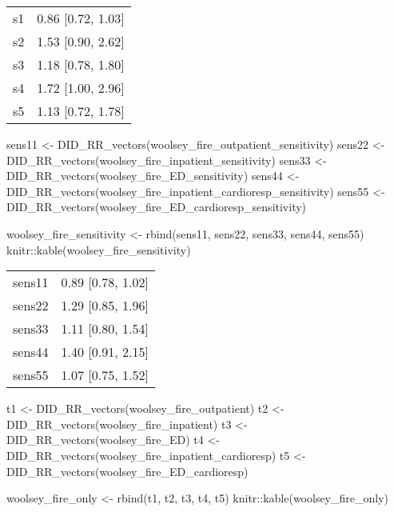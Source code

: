 \documentclass[
]{article}
\newenvironment{Shaded}{\begin{snugshade}}{\end{snugshade}}
\newcommand{\FunctionTok}[1]{\textcolor[rgb]{0.00,0.00,0.00}{#1}}
\newcommand{\NormalTok}[1]{#1}
\newcommand{\OtherTok}[1]{\textcolor[rgb]{0.56,0.35,0.01}{#1}}
\newcommand{\SpecialCharTok}[1]{\textcolor[rgb]{0.00,0.00,0.00}{#1}}
\begin{document}
\begin{longtable}[]{@{}ll@{}}
\toprule()
\endhead
s1 & 0.86 {[}0.72, 1.03{]} \\
s2 & 1.53 {[}0.90, 2.62{]} \\
s3 & 1.18 {[}0.78, 1.80{]} \\
s4 & 1.72 {[}1.00, 2.96{]} \\
s5 & 1.13 {[}0.72, 1.78{]} \\
\bottomrule()
\end{longtable}

\begin{Shaded}
\begin{Highlighting}[]
\NormalTok{sens11 }\OtherTok{\textless{}{-}} \FunctionTok{DID\_RR\_vectors}\NormalTok{(woolsey\_fire\_outpatient\_sensitivity)}
\NormalTok{sens22 }\OtherTok{\textless{}{-}} \FunctionTok{DID\_RR\_vectors}\NormalTok{(woolsey\_fire\_inpatient\_sensitivity)}
\NormalTok{sens33 }\OtherTok{\textless{}{-}} \FunctionTok{DID\_RR\_vectors}\NormalTok{(woolsey\_fire\_ED\_sensitivity)}
\NormalTok{sens44 }\OtherTok{\textless{}{-}} \FunctionTok{DID\_RR\_vectors}\NormalTok{(woolsey\_fire\_inpatient\_cardioresp\_sensitivity)}
\NormalTok{sens55 }\OtherTok{\textless{}{-}} \FunctionTok{DID\_RR\_vectors}\NormalTok{(woolsey\_fire\_ED\_cardioresp\_sensitivity)}

\NormalTok{woolsey\_fire\_sensitivity }\OtherTok{\textless{}{-}} \FunctionTok{rbind}\NormalTok{(sens11, sens22, sens33, sens44, sens55)}
\NormalTok{knitr}\SpecialCharTok{::}\FunctionTok{kable}\NormalTok{(woolsey\_fire\_sensitivity)}
\end{Highlighting}
\end{Shaded}

\begin{longtable}[]{@{}ll@{}}
\toprule()
\endhead
sens11 & 0.89 {[}0.78, 1.02{]} \\
sens22 & 1.29 {[}0.85, 1.96{]} \\
sens33 & 1.11 {[}0.80, 1.54{]} \\
sens44 & 1.40 {[}0.91, 2.15{]} \\
sens55 & 1.07 {[}0.75, 1.52{]} \\
\bottomrule()
\end{longtable}

\begin{Shaded}
\begin{Highlighting}[]
\NormalTok{t1 }\OtherTok{\textless{}{-}} \FunctionTok{DID\_RR\_vectors}\NormalTok{(woolsey\_fire\_outpatient)}
\NormalTok{t2 }\OtherTok{\textless{}{-}} \FunctionTok{DID\_RR\_vectors}\NormalTok{(woolsey\_fire\_inpatient)}
\NormalTok{t3 }\OtherTok{\textless{}{-}} \FunctionTok{DID\_RR\_vectors}\NormalTok{(woolsey\_fire\_ED)}
\NormalTok{t4 }\OtherTok{\textless{}{-}} \FunctionTok{DID\_RR\_vectors}\NormalTok{(woolsey\_fire\_inpatient\_cardioresp)}
\NormalTok{t5 }\OtherTok{\textless{}{-}} \FunctionTok{DID\_RR\_vectors}\NormalTok{(woolsey\_fire\_ED\_cardioresp)}

\NormalTok{woolsey\_fire\_only }\OtherTok{\textless{}{-}} \FunctionTok{rbind}\NormalTok{(t1, t2, t3, t4, t5)}
\NormalTok{knitr}\SpecialCharTok{::}\FunctionTok{kable}\NormalTok{(woolsey\_fire\_only)}
\end{Highlighting}
\end{Shaded}
\end{document}
